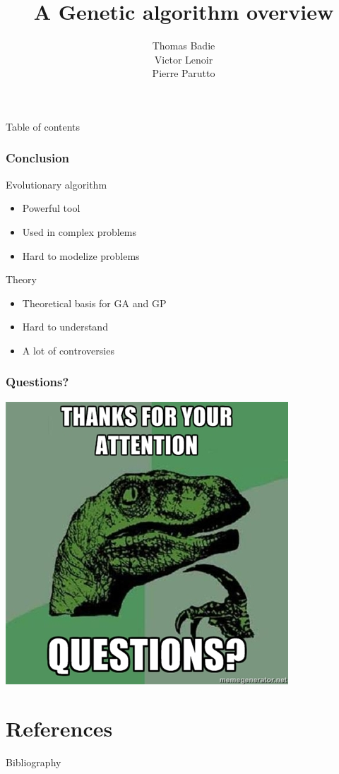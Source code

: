 \documentclass[smaller,pdf,svgnames]{beamer}
\title {A Genetic algorithm overview}
\author[Thomas Badie \and Victor Lenoir \and Pierre Parutto]{Thomas Badie\\Victor Lenoir\\Pierre Parutto}
\institute{}
\begin{document}
\begin{frame}
  \maketitle
\end{frame}

\begin{frame}{Table of contents}
  \tableofcontents
\end{frame}





\begin{frame}
  \frametitle{Conclusion}
  \begin{block}{Evolutionary algorithm}
     \begin{itemize}
     \item Powerful tool
     \item Used in complex problems
     \item Hard to modelize problems
     \end{itemize}
  \end{block}

  \begin{block}{Theory}
    \begin{itemize}
    \item Theoretical basis for GA and GP
    \item Hard to understand
    \item A lot of controversies
    \end{itemize}
  \end{block}
\end{frame}

\begin{frame}
  \frametitle{Questions?}
  \begin{center}
    \includegraphics[scale=0.7]{img/questions.jpg}
  \end{center}
\end{frame}

\section{References}

\begin{frame}[allowframebreaks]{Bibliography}
  \footnotesize
  
  
\end{frame}
\end{document}
